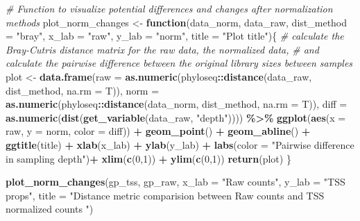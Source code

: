 \documentclass[
]{book}
\newenvironment{Shaded}{\begin{snugshade}}{\end{snugshade}}
\newcommand{\CommentTok}[1]{\textcolor[rgb]{0.56,0.35,0.01}{\textit{#1}}}
\newcommand{\ControlFlowTok}[1]{\textcolor[rgb]{0.13,0.29,0.53}{\textbf{#1}}}
\newcommand{\DataTypeTok}[1]{\textcolor[rgb]{0.13,0.29,0.53}{#1}}
\newcommand{\DecValTok}[1]{\textcolor[rgb]{0.00,0.00,0.81}{#1}}
\newcommand{\KeywordTok}[1]{\textcolor[rgb]{0.13,0.29,0.53}{\textbf{#1}}}
\newcommand{\NormalTok}[1]{#1}
\newcommand{\OperatorTok}[1]{\textcolor[rgb]{0.81,0.36,0.00}{\textbf{#1}}}
\newcommand{\StringTok}[1]{\textcolor[rgb]{0.31,0.60,0.02}{#1}}
\begin{document}
\begin{Shaded}
\begin{Highlighting}[]
\CommentTok{\# Function to visualize potential differences and changes after normalization methods}
\NormalTok{plot\_norm\_changes \textless{}{-}}\StringTok{ }\ControlFlowTok{function}\NormalTok{(data\_norm, data\_raw, }\DataTypeTok{dist\_method =} \StringTok{"bray"}\NormalTok{, }\DataTypeTok{x\_lab =} \StringTok{"raw"}\NormalTok{, }\DataTypeTok{y\_lab =} \StringTok{"norm"}\NormalTok{, }\DataTypeTok{title =} \StringTok{"Plot title"}\NormalTok{)\{}
    \CommentTok{\# calculate the Bray{-}Cutris distance matrix for the raw data, the normalized data, }
    \CommentTok{\# and calculate the pairwise difference between the original library sizes between samples}
\NormalTok{    plot \textless{}{-}}\StringTok{ }\KeywordTok{data.frame}\NormalTok{(}\DataTypeTok{raw =} \KeywordTok{as.numeric}\NormalTok{(phyloseq}\OperatorTok{::}\KeywordTok{distance}\NormalTok{(data\_raw, dist\_method, }\DataTypeTok{na.rm =}\NormalTok{ T)), }
                       \DataTypeTok{norm =} \KeywordTok{as.numeric}\NormalTok{(phyloseq}\OperatorTok{::}\KeywordTok{distance}\NormalTok{(data\_norm, dist\_method, }\DataTypeTok{na.rm =}\NormalTok{ T)), }
                       \DataTypeTok{diff =} \KeywordTok{as.numeric}\NormalTok{(}\KeywordTok{dist}\NormalTok{(}\KeywordTok{get\_variable}\NormalTok{(data\_raw, }\StringTok{"depth"}\NormalTok{)))) }\OperatorTok{\%\textgreater{}\%}\StringTok{ }
\StringTok{    }\KeywordTok{ggplot}\NormalTok{(}\KeywordTok{aes}\NormalTok{(}\DataTypeTok{x =}\NormalTok{ raw, }\DataTypeTok{y =}\NormalTok{ norm, }\DataTypeTok{color =}\NormalTok{ diff)) }\OperatorTok{+}\StringTok{ }
\StringTok{        }\KeywordTok{geom\_point}\NormalTok{() }\OperatorTok{+}\StringTok{ }
\StringTok{        }\KeywordTok{geom\_abline}\NormalTok{() }\OperatorTok{+}\StringTok{ }
\StringTok{        }\KeywordTok{ggtitle}\NormalTok{(title) }\OperatorTok{+}
\StringTok{        }\KeywordTok{xlab}\NormalTok{(x\_lab) }\OperatorTok{+}\StringTok{ }\KeywordTok{ylab}\NormalTok{(y\_lab) }\OperatorTok{+}
\StringTok{        }\KeywordTok{labs}\NormalTok{(}\DataTypeTok{color =} \StringTok{"Pairwise difference in sampling depth"}\NormalTok{)}\OperatorTok{+}
\StringTok{      }\KeywordTok{xlim}\NormalTok{(}\KeywordTok{c}\NormalTok{(}\DecValTok{0}\NormalTok{,}\DecValTok{1}\NormalTok{)) }\OperatorTok{+}\StringTok{ }\KeywordTok{ylim}\NormalTok{(}\KeywordTok{c}\NormalTok{(}\DecValTok{0}\NormalTok{,}\DecValTok{1}\NormalTok{))}
    \KeywordTok{return}\NormalTok{(plot)}
\NormalTok{\}}

\KeywordTok{plot\_norm\_changes}\NormalTok{(gp\_tss, gp\_raw,}
                  \DataTypeTok{x\_lab =} \StringTok{"Raw counts"}\NormalTok{, }\DataTypeTok{y\_lab =} \StringTok{"TSS props"}\NormalTok{, }
                  \DataTypeTok{title =} \StringTok{"Distance metric comparision between Raw counts and TSS normalized counts "}\NormalTok{)}
\end{Highlighting}
\end{Shaded}
\end{document}
